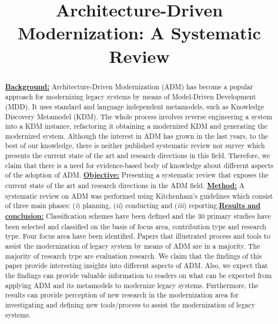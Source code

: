 \documentclass{llncs}
\begin{document}
\title{Architecture-Driven Modernization: A Systematic Review}

\author{}

\maketitle

\begin{abstract}

\underline{\textbf{Background:}} Architecture-Driven Modernization (ADM) has become a popular approach for modernizing legacy systems by means of Model-Driven Development (MDD). It uses standard and language independent metamodels, such as Knowledge Discovery Metamodel (KDM). The whole process involves reverse engineering a system into a KDM instance, refactoring it obtaining a modernized KDM and generating the modernized system. Although the interest in ADM has grown in the last years, to the best of our knowledge, there is neither published systematic review nor survey which presents the current state of the art and research directions in this field. Therefore, we claim that there is a need for evidence-based body of knowledge about different aspects of the adoption of ADM. \underline{\textbf{Objective:}} Presenting a systematic review that exposes the current state of the art and research directions in the ADM field. \underline{\textbf{Method:}} A systematic review on ADM was performed using Kitchenham's guidelines which consist of three main phases: (\textit{i}) planning, (\textit{ii}) conducting and (\textit{iii}) reporting.\underline{\textbf{Results and conclusion:}} Classification schemes have been defined and the 30 primary studies have been selected and classified on the basis of focus area, contribution type and research type. Four focus area have been identified. Papers that illustrated process and tools to assist the modernization of legacy system by means of ADM are in a majority. The majority of research type are evaluation research. We claim that the findings of this paper provide interesting insights into different aspects of ADM. Also, we expect that the findings can provide valuable information to readers on what can be expected from applying ADM and its metamodels to modernize legacy systems. Furthermore, the results can provide perception of new research in the modernization area for investigating and defining new tools/process to assist the modernization of legacy systems.

\end{abstract}
\end{document}
